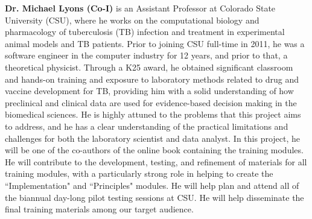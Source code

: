 \documentclass[pdftex,english,11pt,parskip=half]{scrartcl}
\begin{document}
\noindent \textbf{Dr. Michael Lyons (Co-I)} is an Assistant Professor at Colorado State University (CSU), where he works on the computational biology and pharmacology of tuberculosis (TB) infection and treatment in experimental animal models and TB patients. Prior to joining CSU full-time in 2011, he was a software engineer in the computer industry for 12 years, and prior to that, a theoretical physicist. Through a K25 award, he obtained significant classroom and hands-on training and exposure to laboratory methods related to drug and vaccine development for TB, providing him with a solid understanding of how preclinical and clinical data are used for evidence-based decision making in the biomedical sciences. He is highly attuned to the problems that this project aims to address, and he has a clear understanding of the practical limitations and challenges for both the laboratory scientist and data analyst. In this project, he will be one of the co-authors of the online book containing the training modules. He will contribute to the development, testing, and refinement of materials for all training modules, with a particularly strong role in helping to create the ``Implementation" and ``Principles" modules. He will help plan and attend all of the biannual day-long pilot testing sessions at CSU. He will help disseminate the final training materials among our target audience. 
\end{document}
